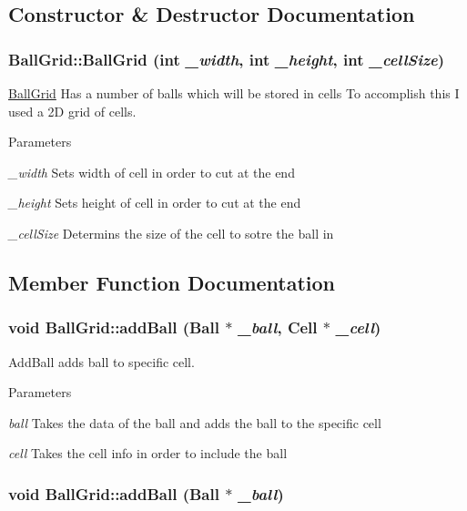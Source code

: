 \subsection{Constructor \& Destructor Documentation}
\hypertarget{classBallGrid_a7bb8b193b697a26feb24ace417e34f2a}{
\subsubsection[{BallGrid}]{\setlength{\rightskip}{0pt plus 5cm}BallGrid::BallGrid (int {\em \_\-width}, \/  int {\em \_\-height}, \/  int {\em \_\-cellSize})}}
\label{classBallGrid_a7bb8b193b697a26feb24ace417e34f2a}


\hyperlink{classBallGrid}{BallGrid} Has a number of balls which will be stored in cells To accomplish this I used a 2D grid of cells. 
\begin{DoxyParams}{Parameters}
\item[{\em \_\-width}]Sets width of cell in order to cut at the end \item[{\em \_\-height}]Sets height of cell in order to cut at the end \item[{\em \_\-cellSize}]Determins the size of the cell to sotre the ball in \end{DoxyParams}


\subsection{Member Function Documentation}
\hypertarget{classBallGrid_a82fd95975c46e31f204dbf17d858e81c}{
\subsubsection[{addBall}]{\setlength{\rightskip}{0pt plus 5cm}void BallGrid::addBall ({\bf Ball} $\ast$ {\em \_\-ball}, \/  {\bf Cell} $\ast$ {\em \_\-cell})}}
\label{classBallGrid_a82fd95975c46e31f204dbf17d858e81c}


AddBall adds ball to specific cell. 
\begin{DoxyParams}{Parameters}
\item[{\em ball}]Takes the data of the ball and adds the ball to the specific cell \item[{\em cell}]Takes the cell info in order to include the ball \end{DoxyParams}
\hypertarget{classBallGrid_ab8cc5670a406da6b7bbafdc04b1235b7}{
\subsubsection[{addBall}]{\setlength{\rightskip}{0pt plus 5cm}void BallGrid::addBall ({\bf Ball} $\ast$ {\em \_\-ball})}}
\label{classBallGrid_ab8cc5670a406da6b7bbafdc04b1235b7}



